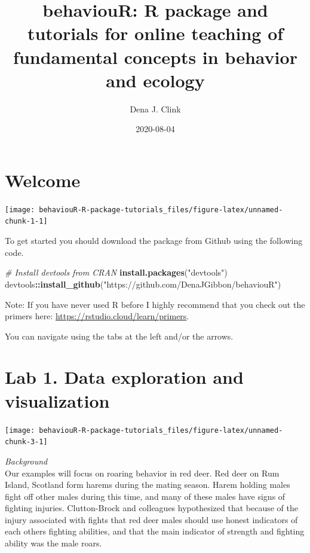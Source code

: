 \documentclass[]{book}
\title{behaviouR: R package and tutorials for online teaching of fundamental concepts in behavior and ecology}
\author{Dena J. Clink}
\date{2020-08-04}
\newenvironment{Shaded}{\begin{snugshade}}{\end{snugshade}}
\newcommand{\CommentTok}[1]{\textcolor[rgb]{0.56,0.35,0.01}{\textit{#1}}}
\newcommand{\KeywordTok}[1]{\textcolor[rgb]{0.13,0.29,0.53}{\textbf{#1}}}
\newcommand{\NormalTok}[1]{#1}
\newcommand{\OperatorTok}[1]{\textcolor[rgb]{0.81,0.36,0.00}{\textbf{#1}}}
\newcommand{\StringTok}[1]{\textcolor[rgb]{0.31,0.60,0.02}{#1}}
\begin{document}
\maketitle

{
\setcounter{tocdepth}{1}
\tableofcontents
}
\hypertarget{welcome}{%
\chapter*{Welcome}\label{welcome}}

\begin{center}\texttt{[image: behaviouR-R-package-tutorials\_files/figure-latex/unnamed-chunk-1-1]} \end{center}

To get started you should download the package from Github using the following code.

\begin{Shaded}
\begin{Highlighting}[]
\CommentTok{# Install devtools from CRAN}
\KeywordTok{install.packages}\NormalTok{(}\StringTok{"devtools"}\NormalTok{)}
\NormalTok{devtools}\OperatorTok{::}\KeywordTok{install_github}\NormalTok{(}\StringTok{"https://github.com/DenaJGibbon/behaviouR"}\NormalTok{)}
\end{Highlighting}
\end{Shaded}

Note: If you have never used R before I highly recommend that you check out the primers here: \url{https://rstudio.cloud/learn/primers}.

You can navigate using the tabs at the left and/or the arrows.

\hypertarget{lab-1.-data-exploration-and-visualization}{%
\chapter{Lab 1. Data exploration and visualization}\label{lab-1.-data-exploration-and-visualization}}

\begin{center}\texttt{[image: behaviouR-R-package-tutorials\_files/figure-latex/unnamed-chunk-3-1]} \end{center}

\emph{Background}\\
Our examples will focus on roaring behavior in red deer. Red deer on Rum Island, Scotland form harems during the mating season. Harem holding males fight off other males during this time, and many of these males have signs of fighting injuries. Clutton-Brock and colleagues hypothesized that because of the injury associated with fights that red deer males should use honest indicators of each others fighting abilities, and that the main indicator of strength and fighting ability was the male roars.
\end{document}
